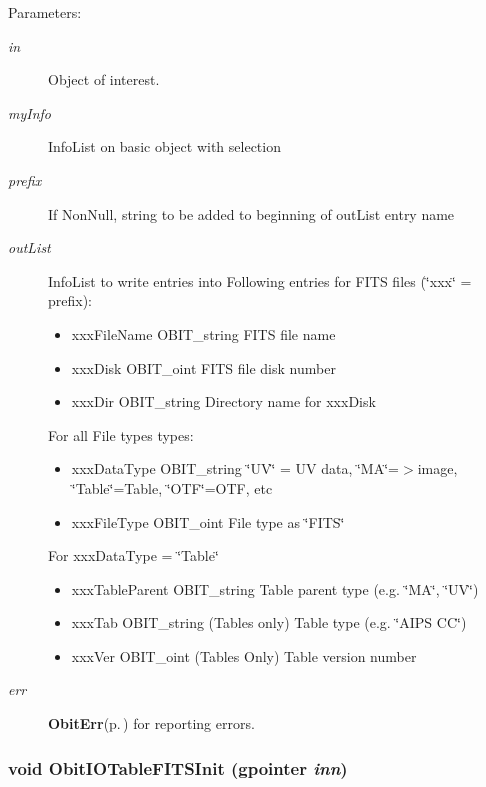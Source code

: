 \begin{Desc}
\item[Parameters:]
\begin{description}
\item[{\em in}]Object of interest. \item[{\em my\-Info}]Info\-List on basic object with selection \item[{\em prefix}]If Non\-Null, string to be added to beginning of out\-List entry name \item[{\em out\-List}]Info\-List to write entries into Following entries for FITS files (\char`\"{}xxx\char`\"{} = prefix): \begin{itemize}
\item xxx\-File\-Name OBIT\_\-string FITS file name \item xxx\-Disk OBIT\_\-oint FITS file disk number \item xxx\-Dir OBIT\_\-string Directory name for xxx\-Disk\end{itemize}
For all File types types: \begin{itemize}
\item xxx\-Data\-Type OBIT\_\-string \char`\"{}UV\char`\"{} = UV data, \char`\"{}MA\char`\"{}=$>$image, \char`\"{}Table\char`\"{}=Table, \char`\"{}OTF\char`\"{}=OTF, etc \item xxx\-File\-Type OBIT\_\-oint File type as \char`\"{}FITS\char`\"{}\end{itemize}
For xxx\-Data\-Type = \char`\"{}Table\char`\"{} \begin{itemize}
\item xxx\-Table\-Parent OBIT\_\-string Table parent type (e.g. \char`\"{}MA\char`\"{}, \char`\"{}UV\char`\"{}) \item xxx\-Tab OBIT\_\-string (Tables only) Table type (e.g. \char`\"{}AIPS CC\char`\"{}) \item xxx\-Ver OBIT\_\-oint (Tables Only) Table version number\end{itemize}
\item[{\em err}]{\bf Obit\-Err}{\rm (p.\,\pageref{structObitErr})} for reporting errors. \end{description}
\end{Desc}
\subsubsection{\setlength{\rightskip}{0pt plus 5cm}void Obit\-IOTable\-FITSInit (gpointer {\em inn})}\label{ObitIOTableFITS_8c_a4}


